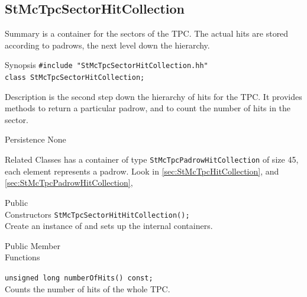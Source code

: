 \clearpage

%
%
\subsection{StMcTpcSectorHitCollection}
 
\label{sec:StMcTpcSectorHitCollection}
\begin{Entry}
\item[Summary]
     is a container for the
    sectors of the TPC.  The actual hits are stored according to
    padrows, the next level down the hierarchy.

\item[Synopsis]
    \verb+#include "StMcTpcSectorHitCollection.hh"+\\
    \verb+class StMcTpcSectorHitCollection;+\\

\item[Description]
     is the second step down
    the hierarchy of hits for the TPC.  It provides
    methods to return a particular padrow, and to
    count the number of hits in the sector.

\item[Persistence]
    None

\item[Related Classes]
    has a container of type {\tt StMcTpcPadrowHitCollection}
    of size 45, each element represents a padrow.  Look in
     \ref{sec:StMcTpcHitCollection},
    and  \ref{sec:StMcTpcPadrowHitCollection},

\item[Public\\ Constructors]
    \verb+StMcTpcSectorHitHitCollection();+\\
    Create an instance of 
    and sets up the internal containers.

\item[Public Member\\ Functions]

    \verb+unsigned long numberOfHits() const;+\\
    Counts the number of hits of the whole TPC.


\end{Entry}
